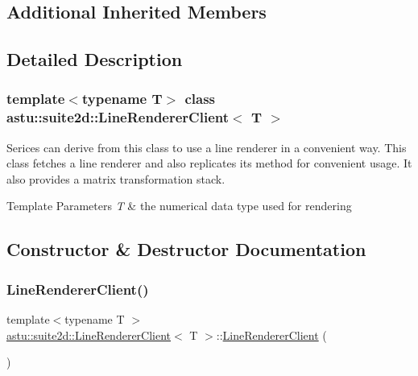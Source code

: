 \subsection*{Additional Inherited Members}


\subsection{Detailed Description}
\subsubsection*{template$<$typename T$>$\newline
class astu\+::suite2d\+::\+Line\+Renderer\+Client$<$ T $>$}

Serices can derive from this class to use a line renderer in a convenient way. This class fetches a line renderer and also replicates its method for convenient usage. It also provides a matrix transformation stack.


\begin{DoxyTemplParams}{Template Parameters}
{\em T} & the numerical data type used for rendering \\
\hline
\end{DoxyTemplParams}


\subsection{Constructor \& Destructor Documentation}
\mbox{\label{classastu_1_1suite2d_1_1LineRendererClient_aaa642bb6ae37511a6d337969d2cef4da}} 
\subsubsection{\texorpdfstring{Line\+Renderer\+Client()}{LineRendererClient()}}
{\footnotesize\ttfamily template$<$typename T $>$ \\
\hyperlink{classastu_1_1suite2d_1_1LineRendererClient}{astu\+::suite2d\+::\+Line\+Renderer\+Client}$<$ T $>$\+::\hyperlink{classastu_1_1suite2d_1_1LineRendererClient}{Line\+Renderer\+Client} (\begin{DoxyParamCaption}{ }\end{DoxyParamCaption})\hspace{0.3cm}{\ttfamily [inline]}}

